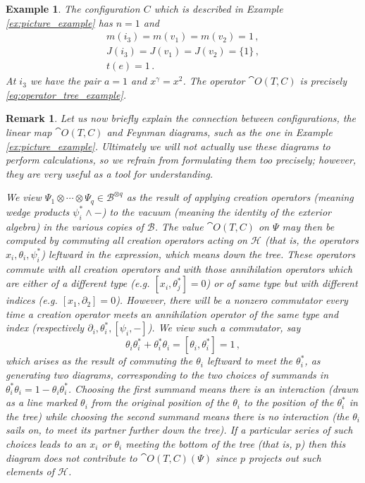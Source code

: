 \documentclass[english,letter paper,12pt,leqno]{article}
\theoremstyle{example}
\newtheorem{example}[theorem]{Example}
\newtheorem{remark}[theorem]{Remark}
\numberwithin{equation}{section}
\begin{document}
\begin{example}\label{ex:picture_example_2} The configuration $C$ which is described in Example \ref{ex:picture_example} has $n = 1$ and
\begin{gather*}
m(i_3) = m(v_1) = m(v_2) = 1\,,\\
J(i_3) = J(v_1) = J(v_2) = \{ 1 \}\,,\\
t(e) = 1\,.
\end{gather*}
At $i_3$ we have the pair $a = 1$ and $x^\gamma = x^2$. The operator $\cat{O}(T,C)$ is precisely \eqref{eq:operator_tree_example}.
\end{example}

\begin{remark} Let us now briefly explain the connection between configurations, the linear map $\cat{O}(T,C)$ and Feynman diagrams, such as the one in Example \ref{ex:picture_example}. Ultimately we will not actually use these diagrams to perform calculations, so we refrain from formulating them too precisely; however, they are very useful as a tool for understanding.

We view $\Psi_1 \otimes \cdots \otimes \Psi_q \in \mathscr{B}^{\otimes q}$ as the result of applying creation operators (meaning wedge products $\psi_i^* \wedge -$) to the vacuum (meaning the identity of the exterior algebra) in the various copies of $\mathscr{B}$. The value $\cat{O}(T,C)$ on $\Psi$ may then be computed by commuting all creation operators acting on $\mathscr{H}$ (that is, the operators $x_i, \theta_i, \psi_i^*$) leftward in the expression, which means \emph{down} the tree. These operators commute with all creation operators and with those annihilation operators which are either of a different type (e.g. $[x_i, \theta_j^*] = 0$) or of same type but with different indices (e.g. $[x_1, \partial_2] = 0$). However, there will be a nonzero commutator every time a creation operator meets an annihilation operator of the same type and index (respectively $\partial_i, \theta_i^*, [\psi_i, -]$). We view such a commutator, say
\[
\theta_i \theta_i^* + \theta_i^* \theta_i = [ \theta_i, \theta_i^* ] = 1\,,
\]
which arises as the result of commuting the $\theta_i$ leftward to meet the $\theta_i^*$, as generating two diagrams, corresponding to the two choices of summands in $\theta_i^* \theta_i = 1 - \theta_i \theta_i^*$. Choosing the first summand means there is an interaction (drawn as a line marked $\theta_i$ from the original position of the $\theta_i$ to the position of the $\theta_i^*$ in the tree) while choosing the second summand means there is no interaction (the $\theta_i$ sails on, to meet its partner further down the tree). If a particular series of such choices leads to an $x_i$ or $\theta_i$ meeting the bottom of the tree (that is, $p$) then this diagram does not contribute to $\cat{O}(T,C)(\Psi)$ since $p$ projects out such elements of $\mathscr{H}$. 


\end{remark}
\end{document}
